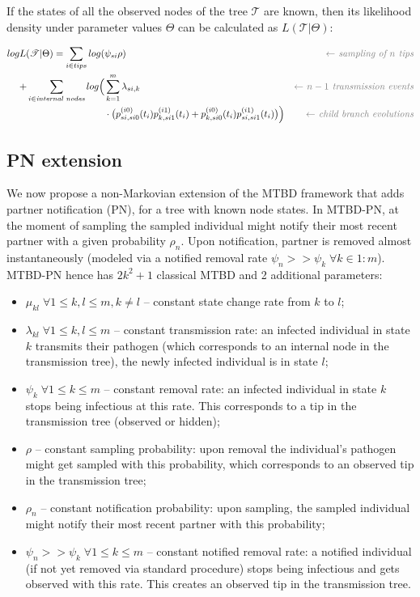 \documentclass[a4paper,10pt]{article}
\begin{document}
If the states of all the observed nodes of the tree $\mathscr{T}$ are known, then its likelihood density under parameter values $\Theta$ can be calculated as $L(\mathscr{T}|\Theta)$:

{\scriptsize
\begin{alignat*}{3}
log L(\mathscr{T}|\Theta) =  \sum\limits_{i \in tips}  log(&\psi_{si}  \rho) & \textit{\color{gray} $\leftarrow$ sampling of $n$ tips} \\
 +\sum\limits_{i \in \textit{internal nodes}} log \Big(&\sum\limits_{k=1}^{m} \lambda_{si,k}  & \textit{\color{gray} $\leftarrow$ $n - 1$ transmission events}\\
 & \cdot \big(p_{si,si0}^{(i0)}(t_i)p_{k,si1}^{(i1)}(t_i) + p_{k,si0}^{(i0)}(t_i)p_{si,si1}^{(i1)}(t_i)\big)\Big) & \textit{\color{gray}$\leftarrow$ child branch evolutions}  \label{eq:mtbd_tree_likelihood}
\end{alignat*}}


\subsection{PN extension}

We now propose a non-Markovian extension of the MTBD framework that adds partner notification (PN), for a tree with known node states.  In MTBD-PN, at the moment of sampling the sampled individual might notify their most recent partner with a given probability $\rho_n$. Upon notification, partner is removed almost instantaneously (modeled via a notified removal rate $\psi_n >> \psi_k \;\forall k \in 1:m$). MTBD-PN hence has $2k^2 + 1$ classical MTBD and 2 additional parameters:
\begin{itemize}
 \item $\mu_{kl} \;\forall 1 \leq k,l  \leq m, k \neq l$ -- constant state change rate from $k$ to $l$;
 \item $\lambda_{kl} \;\forall 1 \leq k,l \leq m$ -- constant transmission rate: an infected individual in state $k$ transmits their pathogen (which corresponds to an internal node in the transmission tree), the newly infected individual is in state $l$;
 \item $\psi_k \;\forall 1 \leq k \leq m$ -- constant removal rate: an infected individual in state $k$ stops being infectious at this rate. This corresponds to a tip in the transmission tree (observed or hidden);
 \item $\rho$ -- constant sampling probability: upon removal the individual's pathogen might get sampled with this probability, which corresponds to an observed tip in the transmission tree;
 \item $\rho_n$ -- constant notification probability: upon sampling, the sampled individual might notify their most recent partner with this probability;
 \item $\psi_n >> \psi_k  \;\forall 1 \leq k \leq m$ -- constant notified removal rate: a notified individual (if not yet removed via standard procedure) stops being infectious and gets observed with this rate. This creates an observed tip in the transmission tree.
\end{itemize}
\end{document}
